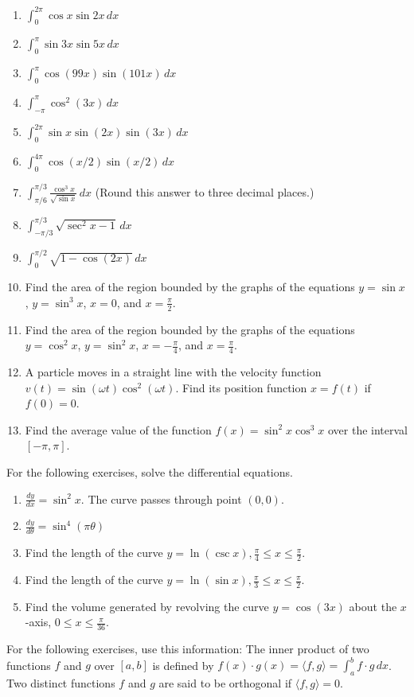 \documentclass{exercises}
\begin{document}
\begin{enumerate}[resume]
\item $\int_{0}^{2\pi}\cos x\sin 2x\,dx$
\item $\int_{0}^{\pi}\sin 3x\sin 5x\,dx$
\item $\int_{0}^{\pi}\cos(99x)\sin(101x)\,dx$
\item $\int_{-\pi}^{\pi}\cos^{2}(3x)\,dx$
\item $\int_{0}^{2\pi}\sin x\sin(2x)\sin(3x)\,dx$
\item $\int_{0}^{4\pi}\cos(x/2)\sin(x/2)\,dx$
\item $\int_{\pi/6}^{\pi/3}\frac{\cos^{3}x}{\sqrt{\sin x}}\,dx$ (Round this answer to three decimal places.)
\item $\int_{-\pi/3}^{\pi/3}\sqrt{\sec^{2}x-1}\,dx$
\item $\int_{0}^{\pi/2}\sqrt{1-\cos(2x)}\,dx$
\item Find the area of the region bounded by the graphs of the equations $y=\sin x$, $y=\sin^{3}x$, $x=0$, and $x=\frac{\pi}{2}$.
\item Find the area of the region bounded by the graphs of the equations $y=\cos^{2}x$, $y=\sin^{2}x$, $x=-\frac{\pi}{4}$, and $x=\frac{\pi}{4}$.
\item A particle moves in a straight line with the velocity function $v(t)=\sin(\omega t)\cos^{2}(\omega t)$. Find its position function $x=f(t)$ if $f(0)=0$.
\item Find the average value of the function $f(x)=\sin^{2}x\cos^{3}x$ over the interval $[-\pi,\pi]$.
\end{enumerate}

For the following exercises, solve the differential equations.

\begin{enumerate}[resume]
\item $\frac{dy}{dx}=\sin^{2}x$. The curve passes through point $(0,0)$.
\item $\frac{dy}{d\theta}=\sin^{4}(\pi \theta)$
\item Find the length of the curve $y=\ln(\csc x),\frac{\pi}{4}\le x\le \frac{\pi}{2}$.
\item Find the length of the curve $y=\ln(\sin x),\frac{\pi}{3}\le x\le \frac{\pi}{2}$.
\item Find the volume generated by revolving the curve $y=\cos(3x)$ about the $x$-axis, $0\le x\le \frac{\pi}{36}$.
\end{enumerate}

For the following exercises, use this information: The inner product of two functions $f$ and $g$ over $[a,b]$ is defined by $f(x)\cdot g(x)=\langle f,g\rangle=\int_{a}^{b}f\cdot g\,dx$. Two distinct functions $f$ and $g$ are said to be orthogonal if $\langle f,g\rangle=0$.
\end{document}
